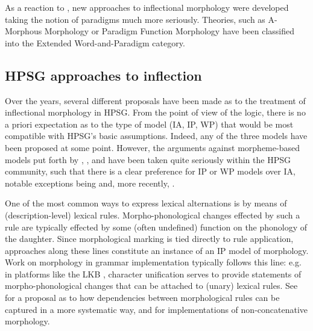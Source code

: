 As a reaction to \citet{Matthews72}, new approaches to inflectional
morphology were developed taking the notion of paradigms much more
seriously. Theories, such as A-Morphous Morphology \citep{Anderson92}
or Paradigm Function Morphology \citep{Stump01} have been classified
into the Extended Word-and-Paradigm category.     



\subsection{HPSG approaches to inflection}
\label{sec:InflHPSG}

Over the years, several different proposals have been made as to the
treatment of inflectional morphology in HPSG. From the point of view
of the logic, there is no a priori expectation as to the type of model
(IA, IP, WP) that would be most compatible with HPSG's basic
assumptions. Indeed, any of the three models have been proposed at
some point. However, the arguments against morpheme-based models put
forth by \citet{Matthews72}, \citet{Spencer91}, \citet{Anderson92} and
\citet{Stump01} have been taken quite seriously within the HPSG
community, such that there is a clear preference for IP or WP models over
IA, notable exceptions being \citet{van-eynde_f94} and, more
recently, \citet{Emerson15}.

One of the most common ways to express lexical alternations is by
means of (description-level) lexical rules. Morpho-phonological changes
effected by such a rule are typically effected by some (often
undefined) function on the phonology of the daughter. Since
morphological marking is tied directly to rule application, approaches
along these lines constitute an instance of an IP model of
morphology. Work on morphology in grammar implementation typically
follows this line: e.g. in platforms like the LKB \citep{Copestake02},
character unification serves to provide statements of
morpho-phonological changes that can be attached to (unary) lexical
rules. See \citet{Goodman10} for a proposal as to how dependencies
between morphological rules can be captured in a more systematic way,
and \citet{Crysmann:15:JLM,Crysmann:2017:JOMO} for implementations of
non-concatenative morphology. 


